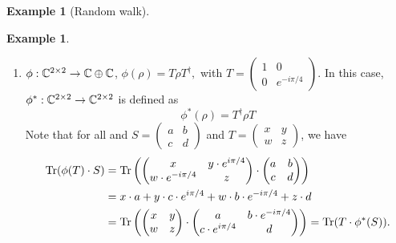 \documentclass[10pt,a4paper]{amsart}
\theoremstyle{definition}
\theoremstyle{definition}
\newtheorem{example}[definition]{Example}
\theoremstyle{definition}
\theoremstyle{definition}
\theoremstyle{definition}
\theoremstyle{definition}
\begin{document}
\begin{example}[Random walk]
\begin{example}
\begin{enumerate}
  \item  $\phi: \mathbb{C}^{2 \times 2} \to  \mathbb{C} \oplus \mathbb{C} $, $\phi(\rho) = T \rho T^\dag,$ with $T = \left(\begin{smallmatrix}
    1 & 0 \\
    0 & e^{-i \pi/4}
  \end{smallmatrix}\right).$ In this case, $\phi^*: \mathbb{C}^{2 \times 2} \to \mathbb{C}^{2 \times 2}  $ is defined as
    $$\phi^*\left( \rho\right) 
    = T^\dag \rho T$$
    Note that for all and $S = \left(\begin{smallmatrix}
    a & b \\
    c & d
  \end{smallmatrix}\right)$ and $T= \left(\begin{smallmatrix}
    x & y \\
    w & z
  \end{smallmatrix}\right)$, we have 
  \begin{align*}
    \text{Tr}(\phi(T)\cdot S) &= \text{Tr}\left(\begin{pmatrix}
    x & y\cdot e^{i \pi/4} \\
    w \cdot e^{-i \pi/4} & z
    \end{pmatrix}\cdot \begin{pmatrix}
    a & b \\
    c & d
    \end{pmatrix}\right) \\
    &= x\cdot a + y \cdot c \cdot e^{i \pi/4} + w\cdot b \cdot e^{-i\pi/4} + z \cdot d \\
    &= \text{Tr}\left(\begin{pmatrix}
    x & y \\
    w  & z
    \end{pmatrix}\cdot \begin{pmatrix}
    a & b\cdot e^{-i \pi/4} \\
    c \cdot e^{i \pi/4} & d
    \end{pmatrix}\right) = \text{Tr}(T\cdot \phi^*(S)).
  \end{align*}


\end{enumerate}
\end{example}
\end{example}
\end{document}
